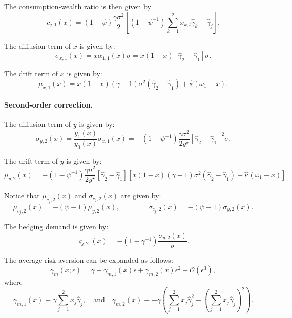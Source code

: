 \documentclass[11pt,english]{article}
\begin{document}
The consumption-wealth ratio is then given by
\begin{equation}
    c_{j,1}(x) = (1-\psi) \frac{\gamma \sigma^2 }{2}\left[ \left(1-\psi^{-1}\right) \sum_{k=1}^2 x_{k,t} \hat{\gamma}_k - \hat{\gamma}_j \right] .
\end{equation}

The diffusion term of $x$ is given by:
\begin{equation}
    \sigma_{x,1}(x) = x \alpha_{1,1}(x) \sigma = x (1-x)\left[ \hat{\gamma}_2 - \hat{\gamma}_1  \right] \sigma.
\end{equation}

The drift term of $x$ is given by:
\begin{equation}
    \mu_{x,1}(x) = x (1-x) (\gamma-1) \sigma^2 (\hat{\gamma}_2 - \hat{\gamma}_1) + \hat{\kappa} (\omega_1 - x).
\end{equation}

\paragraph{Second-order correction.} The diffusion term of $y$ is given by:
\begin{equation}
    \sigma_{y,2}(x) = \frac{y_{1}(x)}{y_0(x)} \sigma_{x,1}(x) = - (1-\psi^{-1}) \frac{\gamma \sigma^2}{2 y^\star} \left[ \hat{\gamma}_2 - \hat{\gamma}_1  \right]^2 \sigma.
\end{equation}

The drift term of $y$ is given by:
\begin{equation}
    \mu_{y,2}(x) = - (1-\psi^{-1}) \frac{\gamma \sigma^2}{2 y^\star} \left[ \hat{\gamma}_2 - \hat{\gamma}_1  \right]  \left[x (1-x) (\gamma-1) \sigma^2 (\hat{\gamma}_2 - \hat{\gamma}_1) + \hat{\kappa} (\omega_1 - x) \right].
\end{equation}

Notice that $\mu_{c_j,2}(x) $ and $\sigma_{c_j,2}(x)$ are given by:
\begin{equation}
    \mu_{c_j,2}(x) = -(\psi-1) \mu_{y,2}(x), \qquad \qquad
    \sigma_{c_j,2}(x) = -(\psi-1) \sigma_{y,2}(x).
\end{equation}

The hedging demand is given by:
\begin{equation}
    \varsigma_{j,2}(x) = -(1-\gamma^{-1}) \frac{\sigma_{y,2}(x)}{\sigma}.
\end{equation}

The average risk aversion can be expanded as follows:
\begin{equation}
    \gamma_m(x;\epsilon) = \gamma + \gamma_{m,1}(x) \epsilon +\gamma_{m,2}(x) \epsilon^2 + \mathcal{O}(\epsilon^3),
\end{equation}
where 
\[\gamma_{m,1}(x) \equiv \gamma\sum_{j=1}^2 x_j \hat{\gamma}_j,\quad\text{and}\quad 
\gamma_{m,2}(x) \equiv - \gamma \left(\sum_{j=1}^2 x_j \hat{\gamma}_j^2 - \left(\sum_{j=1}^2 x_j \hat{\gamma}_j\right)^2\right).\]
\end{document}
